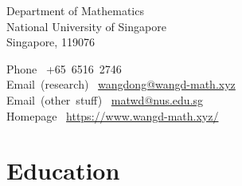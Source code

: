 
{\huge \name}


\bigskip

\begin{minipage}[t]{\englishaddresslength\textwidth}
  Department of Mathematics \\
  National University of Singapore \\
  Singapore, 119076 \\
\end{minipage}
\begin{minipage}[t]{\chineseaddresslength\textwidth}
  \begin{flushright}
  \end{flushright}
\end{minipage}
\begin{minipage}[t]{\emaillength\linewidth}
  \mbox{Phone }  \mbox{+65 6516 2746} \\
  \mbox{Email (research) }  \mbox{\href{mailto:wangdong@wangd-math.xyz}{wangdong@wangd-math.xyz}} \\
  \mbox{Email (other stuff) }  \mbox{\href{mailto:matwd@nus.edu.sg}{matwd@nus.edu.sg}} \\
  \mbox{Homepage }  \mbox{\href{https://www.wangd-math.xyz/}{{https://www.wangd-math.xyz/}}}
\end{minipage}
\section*{Education }

